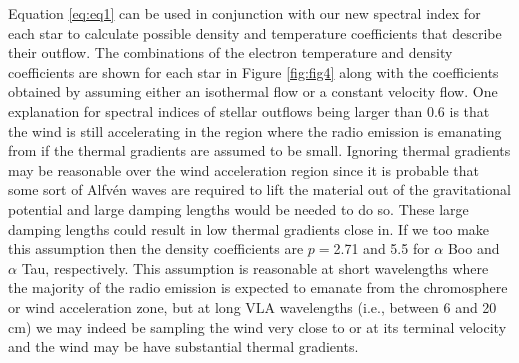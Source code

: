 \documentclass[iop]{emulateapj}
\begin{document}
Equation \ref{eq:eq1} can be used in conjunction with our new spectral index for each star to calculate possible density and temperature coefficients that describe their outflow. The combinations of the electron temperature and density coefficients are shown for each star in Figure \ref{fig:fig4} along with the coefficients obtained by assuming either an isothermal flow or a constant velocity flow. One explanation for spectral indices of stellar outflows being larger than 0.6 is that the wind is still accelerating in the region where the radio emission is emanating from if the thermal gradients are assumed to be small. Ignoring thermal gradients may be reasonable over the wind acceleration region since it is probable that some sort of Alfv\'en waves are required to lift the material out of the gravitational potential and large damping lengths would be needed to do so. These large damping lengths could result in low thermal gradients close in. If we too make this assumption then the density coefficients are $p=$2.71 and 5.5 for $\alpha$ Boo  and $\alpha$ Tau, respectively. This assumption is reasonable at short wavelengths where the majority of the radio emission is expected to emanate from the chromosphere or wind acceleration zone, but at long VLA wavelengths (i.e., between 6 and 20 cm) we may indeed be sampling the wind very close to or at its terminal velocity and the wind may be have substantial thermal gradients. 
\end{document}
